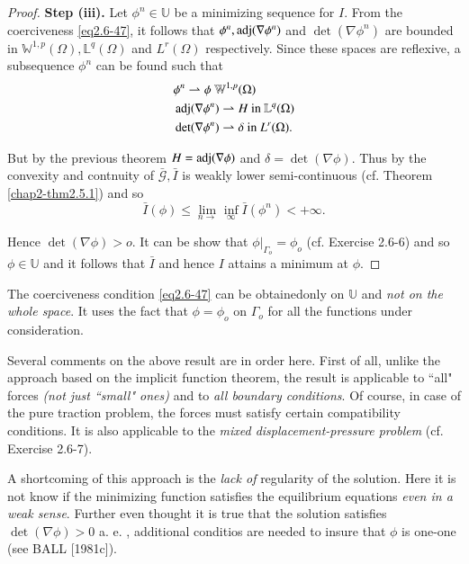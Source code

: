 \begin{proof}
  \noindent\textbf{Step (iii).} Let $\phi ^n \in \mathbb{U}$ be a
  minimizing sequence for 
  $I$. From the coerciveness \eqref{eq2.6-47}, it follows that $\phi ^n,
  \operatorname{adj}(\nabla \phi^n)$ and $\det (\nabla \phi^n)$ are
  bounded in $\mathbb{W}^{1,p}(\Omega), \mathbb{L}^q(\Omega)$ and
  $L^r(\Omega)$ respectively. Since these spaces are reflexive, a
  subsequence $\phi^n$ can be found such that 
  \begin{align*}
    & \phi^n \rightharpoonup \phi ~\mathbb{W}^{1,p}(\Omega)\\
    & \operatorname{adj} (\nabla \phi ^n) \rightharpoonup H ~\text{in}~
    \mathbb{L}^q (\Omega)\\ 
    & \det (\nabla \phi^n)  \rightharpoonup \delta ~\text{in}~ L^r
    (\Omega).  
  \end{align*}
  
  But by the previous theorem $H=\operatorname{adj} (\nabla \phi)$ and
  $\delta =\det (\nabla \phi)$. Thus by the convexity and
  contnuity of $\bar{\mathcal{G}}, \bar{I}$ is weakly lower
  semi-continuous (cf. Theorem \ref{chap2-thm2.5.1}) and so
  $$
  \bar{I}(\phi) \leq \lim _{n \to} \inf _ \infty \bar{I}(\phi^n)< + \infty. 
  $$
  
  Hence $\det(\nabla \phi)>o$. It can be show that $\phi
  |_{\Gamma_o}= \phi _o$ (cf. Exercise 2.6-6) and so $\phi \in
  \mathbb{U}$ and it follows that $\bar{I}$ and hence $I$ attains a
  minimum at $\phi$.  
\end{proof}

\begin{remark}\label{chap2-rem2.6.7} %
 The coerciveness condition \eqref{eq2.6-47} can be obtained\break only on
 $\mathbb{U}$ and \textit{not on the whole space}. It uses the fact
 that $\phi = \phi_o $ on $\Gamma _o$ for all the functions under
 consideration.  
\end{remark}

Several comments on the above result are in order here. First of all,
unlike the approach based on the implicit function theorem, the
result\pageoriginale 
is applicable to ``all" forces \textit{(not just ``small" ones)} and
to \textit{all boundary conditions}. Of course, in case of the pure
traction problem, the forces must satisfy certain compatibility
conditions. It is also applicable to the \textit{mixed
  displacement-pressure problem} (cf. Exercise 2.6-7).  

A shortcoming of this approach is the \textit{lack of} regularity of
the solution. Here it is not know if the minimizing function satisfies
the equilibrium equations \textit{even in a weak sense}. Further even
thought it is true that the solution satisfies $\det (\nabla
\phi) >0$ a. e. , additional conditios are needed to insure that
$\phi$ is one-one (see BALL [1981c]).  

